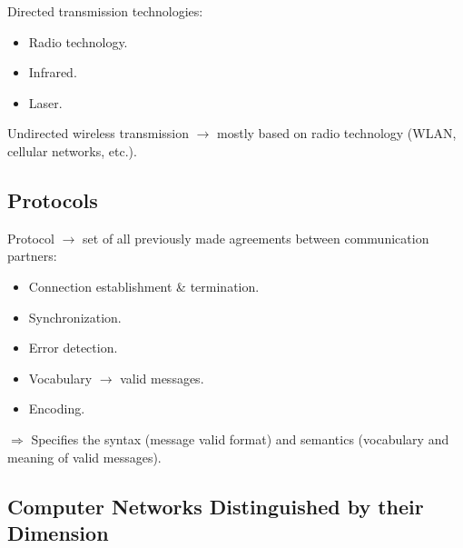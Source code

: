 
\noindent
Directed transmission technologies:

\begin{itemize}
  \item Radio technology.
  \item Infrared.
  \item Laser.
\end{itemize}

\noindent
Undirected wireless transmission $\rightarrow$ mostly based on radio technology (WLAN, cellular networks, etc.).
\medskip

\subsection{Protocols}

\noindent
Protocol $\rightarrow$ set of all previously made agreements between communication partners:

\begin{itemize}
  \item Connection establishment \& termination.
  \item Synchronization.
  \item Error detection.
  \item Vocabulary $\rightarrow$ valid messages.
  \item Encoding.
\end{itemize}

\noindent
$\Rightarrow$ Specifies the syntax (message valid format) and semantics (vocabulary and meaning of valid messages).
\medskip


\subsection{Computer Networks Distinguished by their Dimension}

